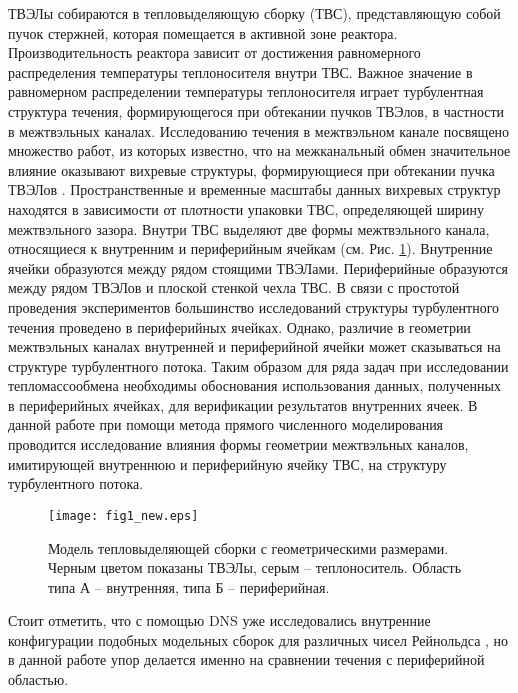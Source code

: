 ТВЭЛы собираются в тепловыделяющую сборку (ТВС), представляющую собой пучок стержней, 
которая помещается в активной зоне реактора. 
%
Производительность реактора зависит от достижения равномерного распределения температуры теплоносителя внутри ТВС. 
%
Важное значение в равномерном распределении температуры теплоносителя играет турбулентная структура течения, 
формирующегося при обтекании пучков ТВЭлов, в частности в межтвэльных каналах. 
%
Исследованию течения в межтвэльном канале посвящено множество работ, из которых известно, 
что на межканальный обмен значительное влияние оказывают вихревые структуры, 
формирующиеся при обтекании пучка ТВЭЛов \cite{meyer2010discovery}. 
%
Пространственные и временные масштабы данных вихревых структур находятся 
в зависимости от плотности упаковки ТВС, определяющей ширину межтвэльного зазора.
%
Внутри ТВС выделяют две формы межтвэльного канала, относящиеся 
к внутренним и периферийным ячейкам (см. Рис. \ref{fig:1}). 
%
Внутренние ячейки образуются между рядом стоящими ТВЭЛами.
%
Периферийные образуются между рядом ТВЭЛов и плоской стенкой чехла ТВС. 
%
В связи с простотой проведения экспериментов большинство исследований структуры 
турбулентного течения проведено в периферийных ячейках.
%
Однако, различие в геометрии межтвэльных каналах внутренней и периферийной ячейки 
может сказываться на структуре турбулентного потока.
%
Таким образом для ряда задач при исследовании тепломассообмена необходимы 
обоснования использования данных, полученных в периферийных ячейках, для верификации результатов внутренних ячеек.
%
В данной работе при помощи метода прямого численного моделирования 
проводится исследование влияния формы геометрии межтвэльных каналов, 
имитирующей внутреннюю и периферийную ячейку ТВС, на структуру турбулентного потока. 
%
%
\begin{figure}[h!]
  \centering
  \texttt{[image: fig1\_new.eps]}
  \caption{Модель тепловыделяющей сборки с геометрическими размерами. 
  Черным цветом показаны ТВЭЛы, серым -- теплоноситель. Область типа А -- внутренняя, 
  типа Б -- периферийная.}
  \label{fig:1}
\end{figure}
%


Стоит отметить, что с помощью DNS уже исследовались внутренние конфигурации 
подобных модельных сборок для различных чисел Рейнольдса \cite{shams2018towards}, 
но в данной работе упор делается именно на сравнении течения с периферийной областью.
%


